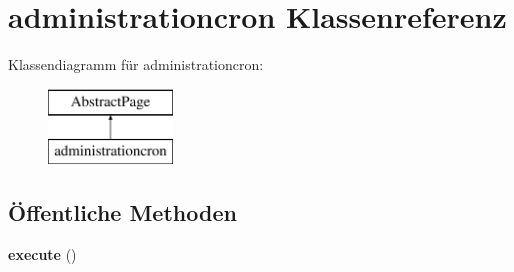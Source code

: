 \hypertarget{classadministrationcron}{}\section{administrationcron Klassenreferenz}
\label{classadministrationcron}
Klassendiagramm für administrationcron\+:\begin{figure}[H]
\begin{center}
\leavevmode
\includegraphics[height=2.000000cm]{classadministrationcron}
\end{center}
\end{figure}
\subsection*{Öffentliche Methoden}
\begin{DoxyCompactItemize}
\item 
\mbox{\label{classadministrationcron_a01e3e615653fd7b890ef09dd7607c5b7}} 
{\bfseries execute} ()
\end{DoxyCompactItemize}
